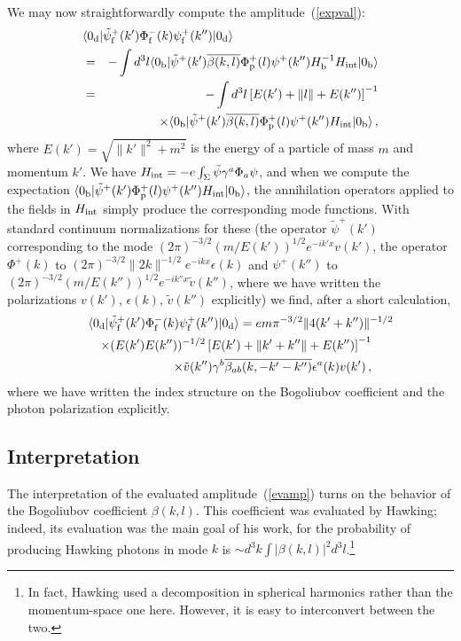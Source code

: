 \documentclass[12pt]{article}
\begin{document}
We may now straightforwardly compute the amplitude~(\ref{expval}):
\begin{eqnarray}
\lefteqn{\langle 0_{\rm d}|{\tilde\psi}^+_{\rm f}(k')\Phi
^-_{\rm f}(k)\psi ^+_{\rm f}(k'')|0_{\rm d}\rangle}\nonumber\\
 &=&
-\int d^3l\langle 0_{\rm b}|{\tilde\psi}^+(k') \overline{\beta (k,l)}
\Phi ^+_{\rm p}
(l)
\psi ^+(k'')H_{\rm b}^{-1}H_{\rm int}|0_{\rm b}\rangle\nonumber\\
 &=&
-\int d^3l\left[ E(k')+\| l\|+ E(k'')\right] ^{-1}\nonumber\\ &&\times
   \langle 0_{\rm b}|{\tilde\psi}^+(k') \overline{\beta (k,l)}\Phi ^+_{\rm p}
(l)
\psi ^+(k'')H_{\rm int}|0_{\rm b}\rangle\, ,
\end{eqnarray}
where $E(k')=\sqrt{\| k'\|^2 +m^2}$ is the energy of a particle of
mass $m$ and momentum $k'$.  
We have
$H_{\rm int}=-e\int _\Sigma\tilde\psi\gamma ^a\Phi _a\psi $, and when we compute
the expectation
$\langle 0_{\rm b}|{\tilde\psi}^+(k') \Phi ^+_{\rm p} (l)
\psi ^+(k'')H_{\rm int}|0_{\rm b}\rangle$, the annihilation operators applied to
the fields in $H_{\rm int}$ simply produce the corresponding mode functions. 
With standard continuum normalizations for these
(the operator
${\tilde\psi}^+(k')$ corresponding to the mode $(2\pi )^{-3/2}
(m/E(k'))^{1/2} e^{-ik'x}
v(k')$, the operator $\Phi ^+(k)$ to $(2\pi )^{-3/2} \| 2k\| ^{-1/2}e^{-ikx}
\epsilon (k)$ and $\psi ^+(k'')$ to $(2\pi )^{-3/2}
(m/E(k''))^{1/2} e^{-ik''x} {\tilde v}(k'')$, where we have written the
polarizations $v(k')$, $\epsilon (k)$, ${\tilde v}(k'')$ explicitly)
we find, after a short calculation,
\begin{eqnarray}\label{evamp}
\lefteqn{\langle 0_{\rm d}|{\tilde\psi}^+_{\rm f}(k')\Phi
^-_{\rm f}(k)\psi ^+_{\rm f}(k'')|0_{\rm d}\rangle
=e m\pi ^{-3/2} \| 4(k'+k'')\| ^{-1/2}}\nonumber\\
&&\times (E(k')E(k''))^{-1/2}
\left[ E(k') +\| k'+k''\| +E(k'')\right]
^{-1} \nonumber\\
&&\times\tilde{v} (k'')\gamma^b
\overline{\beta _{ab}(k,-k'-k'')}\epsilon ^a(k) v(k') \, ,
\end{eqnarray}
where we have written the index structure on the Bogoliubov coefficient 
and the photon polarization explicitly.

\subsection{Interpretation}

The interpretation of the evaluated amplitude~(\ref{evamp})  turns on the
behavior of the Bogoliubov coefficient $\beta (k,l)$.  This coefficient was
evaluated by Hawking; indeed, its evaluation was the main goal of his work, for
the probability of producing Hawking photons in mode $k$ is $\sim d^3k
\int |\beta
(k,l)|^2 d^3l$.\footnote{In fact, Hawking used a decomposition in spherical
harmonics rather than the momentum-space one here.  However, it is easy to
interconvert between the two.}
\end{document}
